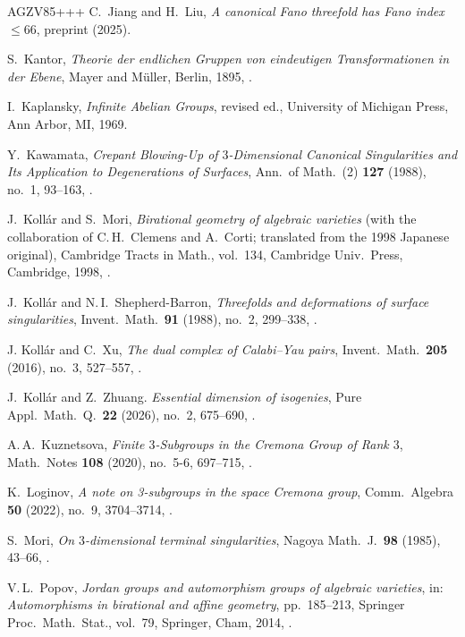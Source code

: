 \documentclass[11pt]{amsart}
\numberwithin{equation}{section}
\theoremstyle{definition}
\theoremstyle{remark}
\begin{document}
\begin{thebibliography}{AGZV85+++}
C.~Jiang and H.~Liu,
{\em A canonical Fano threefold has Fano index $\leq66$}, 
preprint  (2025).

S.~Kantor,
{\em Theorie der endlichen Gruppen von eindeutigen Transformationen in der Ebene}, Mayer and M\"uller, Berlin, 1895,
.

I.~Kaplansky,
{\em Infinite Abelian Groups}, revised ed.,
University of Michigan Press, Ann Arbor, MI, 1969.

Y.~Kawamata,
 {\em Crepant Blowing-Up of $3$-Dimensional Canonical Singularities and Its Application to Degenerations of Surfaces}, 
 Ann.\ of Math.~(2) \textbf{127} (1988), no.~1, 93--163,
 .

  J.~Koll\'{a}r and S.~Mori,
  {\em Birational geometry of algebraic varieties} 
 (with the collaboration of C.\,H.~Clemens and A.~Corti; translated from the 1998 Japanese original), Cambridge Tracts in Math., vol.~134, Cambridge Univ.\ Press, Cambridge, 1998, .

J.~Koll\'ar and N.\,I.~Shepherd-Barron,
 {\em Threefolds and deformations of surface singularities},
 Invent.\ Math.\ \textbf{91} (1988), no.~2, 299--338,
.
 
J. Koll\'{a}r and C.~Xu,
 {\em The dual complex of Calabi--Yau pairs}, 
 Invent.\ Math.\ \textbf{205} (2016), no.~3, 527--557,
 .

J.~Koll\'{a}r and Z.~Zhuang.
{\em Essential dimension of isogenies},
Pure Appl.\ Math.~Q.\ \textbf{22} (2026), no.~2, 675--690,
.


A.\,A.~Kuznetsova, 
 {\em Finite $3$-Subgroups in the Cremona Group of Rank $3$},
 Math.\ Notes \textbf{108} (2020), no.~5-6, 697--715,
 .

K.~Loginov, 
 {\em A note on 3-subgroups in the space Cremona group}, 
 Comm.\ Algebra \textbf{50} (2022), no.~9, 3704--3714,
 .

S.~Mori, 
 {\em On $3$-dimensional terminal singularities}, 
 Nagoya Math.~J.\ \textbf{98} (1985), 43--66,
 .

V.\,L.~Popov,
 {\em Jordan groups and automorphism groups of algebraic varieties}, 
 in: {\em Automorphisms in birational and affine geometry}, pp.~185--213, Springer Proc.\ Math.\ Stat., vol.~79, Springer, Cham, 2014,
 .
  

\end{thebibliography}
\end{document}
